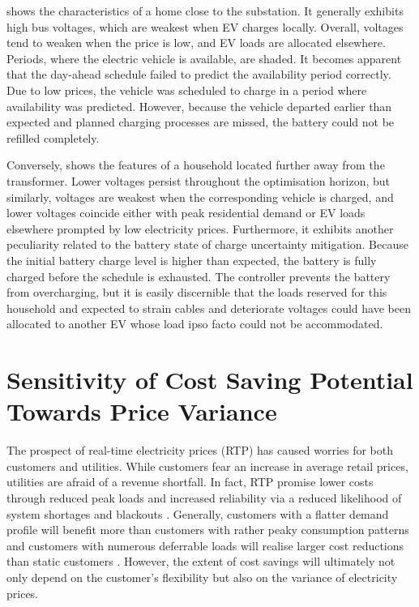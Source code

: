  shows the characteristics of a home close to the substation. It generally exhibits high bus voltages, which are weakest when EV charges locally. Overall, voltages tend to weaken when the price is low, and EV loads are allocated elsewhere. Periods, where the electric vehicle is available, are shaded. It becomes apparent that the day-ahead schedule failed to predict the availability period correctly. Due to low prices, the vehicle was scheduled to charge in a period where availability was predicted. However, because the vehicle departed earlier than expected and planned charging processes are missed, the battery could not be refilled completely.

Conversely,  shows the features of a household located further away from the transformer. Lower voltages persist throughout the optimisation horizon, but similarly, voltages are weakest when the corresponding vehicle is charged, and lower voltages coincide either with peak residential demand or EV loads elsewhere prompted by low electricity prices. Furthermore, it exhibits another peculiarity related to the battery state of charge uncertainty mitigation. Because the initial battery charge level is higher than expected, the battery is fully charged before the schedule is exhausted. The controller prevents the battery from overcharging, but it is easily discernible that the loads reserved for this household and expected to strain cables and deteriorate voltages could have been allocated to another EV whose load ipso facto could not be accommodated.

\section{Sensitivity of Cost Saving Potential Towards Price Variance}
\label{sec:pseval}

The prospect of real-time electricity prices (RTP) has caused worries for both customers and utilities. While customers fear an increase in average retail prices, utilities are afraid of a revenue shortfall. In fact, RTP promise lower costs through reduced peak loads and increased reliability via a reduced likelihood of system shortages and blackouts \cite{Borenstein2002}. Generally, customers with a flatter demand profile will benefit more than customers with rather peaky consumption patterns and customers with numerous deferrable loads will realise larger cost reductions than static customers \cite{Borenstein2002}. However, the extent of cost savings will ultimately not only depend on the customer's flexibility but also on the variance of electricity prices.

